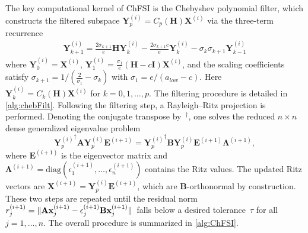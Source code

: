 \documentclass[preprint,3p,number,sort&compress]{elsarticle}
\newcommand{\bx}{\textbf{x}}
\newcommand{\bA}{\textbf{A}}
\newcommand{\bB}{\textbf{B}}
\newcommand{\bE}{\textbf{E}}
\newcommand{\bH}{\textbf{H}}
\newcommand{\bI}{\textbf{I}}
\newcommand{\bX}{\textbf{X}}
\newcommand{\bY}{\textbf{Y}}
\newcommand{\bLam}{\boldsymbol{\Lambda}}
\newcommand{\cblue }{\color{black}}
\newcommand{\cn}{\color{black}}
\DeclarePairedDelimiter\norm{\lVert}{\rVert\,}%
\begin{document}
{\cblue The key computational kernel of ChFSI is the Chebyshev polynomial filter, which constructs the filtered subspace $\bY_p^{(i)}=C_p(\bH)\bX^{(i)}$ via the three-term recurrence
\begin{align}
  \bY_{k+1}^{(i)}=\frac{2\sigma_{k+1}}{e}\bH\bY_k^{(i)}-\frac{2\sigma_{k+1}c}{e}\bY_k^{(i)}-\sigma_k\sigma_{k+1}\bY_{k-1}^{(i)}\label{eqn:ChFSIrecurrence}
\end{align}
where $\bY_0^{(i)}=\bX^{(i)}$, $\bY_1^{(i)}=\frac{\sigma_1}{e}(\bH-c\bI)\bX^{(i)}$, and the scaling coefficients satisfy $\sigma_{k+1}=1/\left(\frac{2}{\sigma_1} - \sigma_k\right)$ with $\sigma_1=e/(a_{low}-c)$. Here $\bY_k^{(i)}=C_k(\bH)\bX^{(i)}$ for $k=0,1,\dots,p$. The filtering procedure is detailed in \cref{alg:chebFilt}. Following the filtering step, a Rayleigh--Ritz projection is performed. Denoting the conjugate transpose by~$^\dagger$, one solves the reduced $n\times n$ dense generalized eigenvalue problem 
\[
{\bY_p^{(i)}}^\dagger\bA\bY_p^{(i)}\bE^{(i+1)}={\bY_p^{(i)}}^\dagger\bB\bY_p^{(i)}\bE^{(i+1)}\bLam^{(i+1)},
\]
where $\bE^{(i+1)}$ is the eigenvector matrix and $\bLam^{(i+1)}=\mathrm{diag}(\epsilon_1^{(i+1)},\dots,\epsilon_n^{(i+1)})$ contains the Ritz values. The updated Ritz vectors are $\bX^{(i+1)}=\bY_p^{(i)}\bE^{(i+1)}$, which are $\bB$-orthonormal by construction. These two steps are repeated until the residual norm $r_j^{(i+1)}=\norm{\bA\bx_j^{(i+1)}-\epsilon_j^{(i+1)}\bB\bx_j^{(i+1)}}$ falls below a desired tolerance~$\tau$ for all $j=1,\dots,n$. The overall procedure is summarized in \cref{alg:ChFSI}.\cn}
\end{document}
